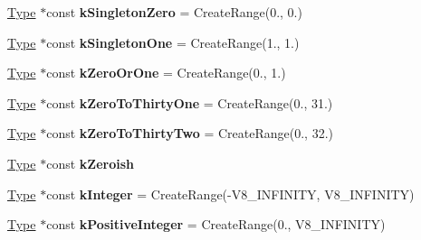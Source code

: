 \begin{DoxyCompactItemize}
\item 
\hyperlink{classv8_1_1internal_1_1_type}{Type} $\ast$const {\bfseries k\+Singleton\+Zero} = Create\+Range(0., 0.)\hypertarget{classv8_1_1internal_1_1_type_cache_a9aed9d0a3ae98c29399e4a53b2dbafc8}{}\label{classv8_1_1internal_1_1_type_cache_a9aed9d0a3ae98c29399e4a53b2dbafc8}

\item 
\hyperlink{classv8_1_1internal_1_1_type}{Type} $\ast$const {\bfseries k\+Singleton\+One} = Create\+Range(1., 1.)\hypertarget{classv8_1_1internal_1_1_type_cache_a705e9c43aef39ae471fd50b31579bcc0}{}\label{classv8_1_1internal_1_1_type_cache_a705e9c43aef39ae471fd50b31579bcc0}

\item 
\hyperlink{classv8_1_1internal_1_1_type}{Type} $\ast$const {\bfseries k\+Zero\+Or\+One} = Create\+Range(0., 1.)\hypertarget{classv8_1_1internal_1_1_type_cache_a4c96272ce8a54dc9ca53a396e667ac3a}{}\label{classv8_1_1internal_1_1_type_cache_a4c96272ce8a54dc9ca53a396e667ac3a}

\item 
\hyperlink{classv8_1_1internal_1_1_type}{Type} $\ast$const {\bfseries k\+Zero\+To\+Thirty\+One} = Create\+Range(0., 31.)\hypertarget{classv8_1_1internal_1_1_type_cache_a826a347ac1efe775d6c5bf3178647424}{}\label{classv8_1_1internal_1_1_type_cache_a826a347ac1efe775d6c5bf3178647424}

\item 
\hyperlink{classv8_1_1internal_1_1_type}{Type} $\ast$const {\bfseries k\+Zero\+To\+Thirty\+Two} = Create\+Range(0., 32.)\hypertarget{classv8_1_1internal_1_1_type_cache_a4571e0da527c8dda67ce6d420f41e61b}{}\label{classv8_1_1internal_1_1_type_cache_a4571e0da527c8dda67ce6d420f41e61b}

\item 
\hyperlink{classv8_1_1internal_1_1_type}{Type} $\ast$const {\bfseries k\+Zeroish}
\item 
\hyperlink{classv8_1_1internal_1_1_type}{Type} $\ast$const {\bfseries k\+Integer} = Create\+Range(-\/V8\+\_\+\+I\+N\+F\+I\+N\+I\+TY, V8\+\_\+\+I\+N\+F\+I\+N\+I\+TY)\hypertarget{classv8_1_1internal_1_1_type_cache_a5fe32811bbcd7deedf628beb78fa64f1}{}\label{classv8_1_1internal_1_1_type_cache_a5fe32811bbcd7deedf628beb78fa64f1}

\item 
\hyperlink{classv8_1_1internal_1_1_type}{Type} $\ast$const {\bfseries k\+Positive\+Integer} = Create\+Range(0., V8\+\_\+\+I\+N\+F\+I\+N\+I\+TY)\hypertarget{classv8_1_1internal_1_1_type_cache_a470bbd269fe7c83d35f505cc68e0c164}{}\label{classv8_1_1internal_1_1_type_cache_a470bbd269fe7c83d35f505cc68e0c164}


\end{DoxyCompactItemize}
